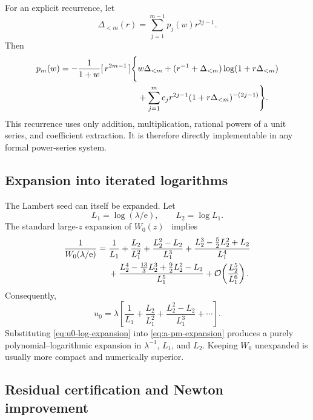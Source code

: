 \documentclass[11pt,a4paper]{article}
\numberwithin{equation}{section}
\theoremstyle{definition}
\theoremstyle{remark}
\newcommand{\e}{\mathrm e}
\newcommand{\Ord}{\mathcal O}
\newcommand{\coeff}[2]{[\,#1^{#2}\,]}
\begin{document}
For an explicit recurrence, let
\begin{equation}\label{eq:Delta-less-m}
 \Delta_{<m}(r)=\sum_{j=1}^{m-1}p_j(w)r^{2j-1}.
\end{equation}
Then
\begin{align}
 p_m(w)=-\frac1{1+w}\coeff{r}{2m-1}
 \Bigg\{&w\Delta_{<m}
 +(r^{-1}+\Delta_{<m})\log(1+r\Delta_{<m})\notag\\
 &+\sum_{j=1}^{m}c_jr^{2j-1}
  (1+r\Delta_{<m})^{-(2j-1)}\Bigg\}.
 \label{eq:pm-recurrence}
\end{align}
This recurrence uses only addition, multiplication, rational powers of a
unit series, and coefficient extraction.  It is therefore directly
implementable in any formal power-series system.

\subsection{Expansion into iterated logarithms}

The Lambert seed can itself be expanded.  Let
\begin{equation}\label{eq:L1L2-def}
 L_1=\log(\lambda/\e),
 \qquad L_2=\log L_1.
\end{equation}
The standard large-$z$ expansion of $W_0(z)$~\cite{CorlessEtAl1996} implies
\begin{align}
 \frac1{W_0(\lambda/\e)}={}&
 \frac1{L_1}+\frac{L_2}{L_1^2}
 +\frac{L_2^2-L_2}{L_1^3}
 +\frac{L_2^3-\frac52L_2^2+L_2}{L_1^4}\notag\\
 &+\frac{L_2^4-\frac{13}{3}L_2^3+\frac92L_2^2-L_2}{L_1^5}
 +\Ord\!\left(\frac{L_2^5}{L_1^6}\right).
 \label{eq:inverse-W-expansion}
\end{align}
Consequently,
\begin{equation}\label{eq:u0-log-expansion}
 u_0=\lambda\left[
 \frac1{L_1}+\frac{L_2}{L_1^2}
 +\frac{L_2^2-L_2}{L_1^3}+\cdots\right].
\end{equation}
Substituting \eqref{eq:u0-log-expansion} into
\eqref{eq:a-pm-expansion} produces a purely polynomial--logarithmic
expansion in $\lambda^{-1}$, $L_1$, and $L_2$.  Keeping $W_0$ unexpanded is
usually more compact and numerically superior.

\subsection{Residual certification and Newton improvement}
\end{document}
